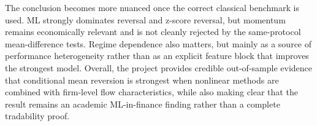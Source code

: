 The conclusion becomes more nuanced once the correct classical benchmark is
used. ML strongly dominates reversal and z-score reversal, but momentum remains
economically relevant and is not cleanly rejected by the same-protocol
mean-difference tests. Regime dependence also matters, but mainly as a source
of performance heterogeneity rather than as an explicit feature block that
improves the strongest model. Overall, the project provides credible
out-of-sample evidence that conditional mean reversion is strongest when
nonlinear methods are combined with firm-level flow characteristics, while also
making clear that the result remains an academic ML-in-finance finding rather
than a complete tradability proof.
